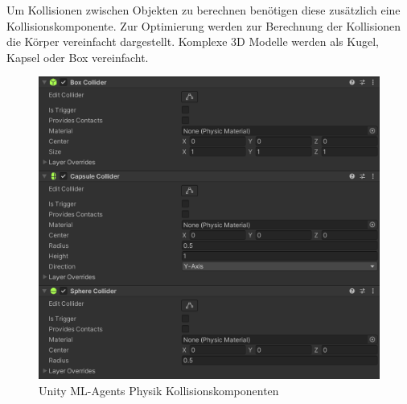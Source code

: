  Um Kollisionen zwischen Objekten zu berechnen benötigen diese zusätzlich eine Kollisionskomponente. Zur Optimierung werden zur Berechnung der Kollisionen die Körper vereinfacht dargestellt. Komplexe 3D Modelle werden als Kugel, Kapsel oder Box vereinfacht.
 \begin{figure}[H]
  \centering  
  \includegraphics[scale=0.5]{img/physik_kollision.png}
  \caption{Unity ML-Agents Physik Kollisionskomponenten}
  \label{fig:physik_kollision}
\end{figure}

